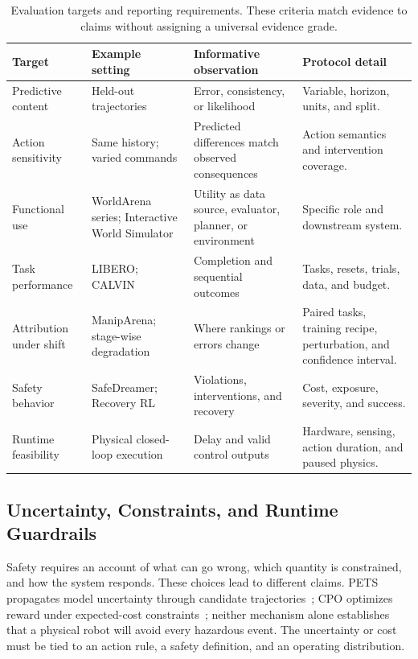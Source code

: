 \begin{table}[t]
\caption{Evaluation targets and reporting requirements. These criteria match evidence to claims without assigning a universal evidence grade.}
\label{tab:evaluation}
\small
\begin{tabularx}{\linewidth}{@{}>{\raggedright\arraybackslash}p{.17\linewidth}YYY@{}}
\toprule
Target & Example setting & Informative observation & Protocol detail \\
\midrule
Predictive content & Held-out trajectories & Error, consistency, or likelihood & Variable, horizon, units, and split. \\
\addlinespace
Action sensitivity & Same history; varied commands & Predicted differences match observed consequences & Action semantics and intervention coverage. \\
\addlinespace
Functional use & WorldArena series; Interactive World Simulator~\cite{shang2026worldarena,shang2026worldarena2,wang2026interactive} & Utility as data source, evaluator, planner, or environment & Specific role and downstream system. \\
\addlinespace
Task performance & LIBERO; CALVIN~\cite{liu2023libero,mees2022calvin} & Completion and sequential outcomes & Tasks, resets, trials, data, and budget. \\
\addlinespace
Attribution under shift & ManipArena; stage-wise degradation~\cite{sun2026maniparena,lee2026stagewise} & Where rankings or errors change & Paired tasks, training recipe, perturbation, and confidence interval. \\
\addlinespace
Safety behavior & SafeDreamer; Recovery RL~\cite{huang2024safedreamer,thananjeyan2021recovery} & Violations, interventions, and recovery & Cost, exposure, severity, and success. \\
\addlinespace
Runtime feasibility & Physical closed-loop execution & Delay and valid control outputs & Hardware, sensing, action duration, and paused physics. \\
\bottomrule
\end{tabularx}
\end{table}

\subsection{Uncertainty, Constraints, and Runtime Guardrails}
Safety requires an account of what can go wrong, which quantity is constrained, and how the system responds. These choices lead to different claims. PETS propagates model uncertainty through candidate trajectories~\cite{chua2018pets}; CPO optimizes reward under expected-cost constraints~\cite{achiam2017cpo}; neither mechanism alone establishes that a physical robot will avoid every hazardous event. The uncertainty or cost must be tied to an action rule, a safety definition, and an operating distribution.

